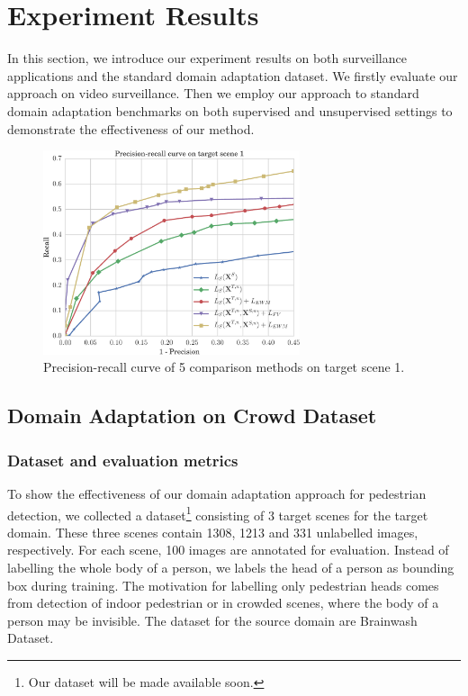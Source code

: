 \documentclass[runningheads]{llncs}
\begin{document}
\section{Experiment Results}
\label{section:Experiment Results}

In this section, we introduce our experiment results on both surveillance applications and the standard domain adaptation dataset. We firstly evaluate our approach on video surveillance. Then we employ our approach to standard domain adaptation benchmarks on both supervised and unsupervised settings to demonstrate the effectiveness of our method.

\begin{figure}
\centering
\includegraphics[height=6cm]{images/pr_curve.pdf}
\caption{Precision-recall curve of 5 comparison methods on target scene 1.}
\label{fig:pr_curve}
\end{figure}

\subsection{Domain Adaptation on Crowd Dataset}

\subsubsection{Dataset and evaluation metrics}
To show the effectiveness of our domain adaptation approach for pedestrian detection, we collected a dataset\footnote{Our dataset will be made available soon.} consisting of 3 target scenes for the target domain. These three scenes contain 1308, 1213 and 331 unlabelled images, respectively. For each scene, 100 images are annotated for evaluation. Instead of labelling the whole body of a person, we labels the head of a person as bounding box during training. The motivation for labelling only pedestrian heads comes from detection of indoor pedestrian or in crowded scenes, where the body of a person may be invisible. The dataset for the source domain are Brainwash Dataset\cite{stewart2015end}.
\end{document}
